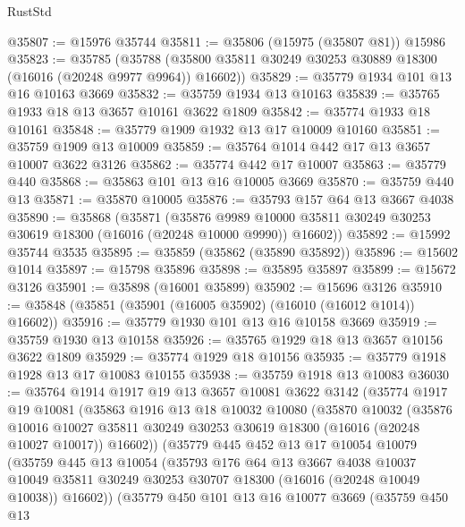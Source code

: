 \begin{lexlean}{RustStd}
\begin{coremodule}
@35807 := @15976 @35744
@35811 := @35806 (@15975 (@35807 @81)) @15986
@35823 := @35785
    (@35788 (@35800 @35811 @30249 @30253 @30889 @18300 (@16016 (@20248 @9977 @9964)) @16602))
@35829 := @35779 @1934 @101 @13 @16 @10163 @3669
@35832 := @35759 @1934 @13 @10163
@35839 := @35765 @1933 @18 @13 @3657 @10161 @3622 @1809
@35842 := @35774 @1933 @18 @10161
@35848 := @35779 @1909 @1932 @13 @17 @10009 @10160
@35851 := @35759 @1909 @13 @10009
@35859 := @35764 @1014 @442 @17 @13 @3657 @10007 @3622 @3126
@35862 := @35774 @442 @17 @10007
@35863 := @35779 @440
@35868 := @35863 @101 @13 @16 @10005 @3669
@35870 := @35759 @440 @13
@35871 := @35870 @10005
@35876 := @35793 @157 @64 @13 @3667 @4038
@35890 := @35868
    (@35871
      (@35876
        @9989
        @10000
        @35811
        @30249
        @30253
        @30619
        @18300
        (@16016 (@20248 @10000 @9990))
        @16602))
@35892 := @15992 @35744 @3535
@35895 := @35859 (@35862 (@35890 @35892))
@35896 := @15602 @1014
@35897 := @15798 @35896
@35898 := @35895 @35897
@35899 := @15672 @3126
@35901 := @35898 (@16001 @35899)
@35902 := @15696 @3126
@35910 := @35848 (@35851 (@35901 (@16005 @35902) (@16010 (@16012 @1014)) @16602))
@35916 := @35779 @1930 @101 @13 @16 @10158 @3669
@35919 := @35759 @1930 @13 @10158
@35926 := @35765 @1929 @18 @13 @3657 @10156 @3622 @1809
@35929 := @35774 @1929 @18 @10156
@35935 := @35779 @1918 @1928 @13 @17 @10083 @10155
@35938 := @35759 @1918 @13 @10083
@36030 := @35764
    @1914
    @1917
    @19
    @13
    @3657
    @10081
    @3622
    @3142
    (@35774
      @1917
      @19
      @10081
      (@35863
        @1916
        @13
        @18
        @10032
        @10080
        (@35870
          @10032
          (@35876
            @10016
            @10027
            @35811
            @30249
            @30253
            @30619
            @18300
            (@16016 (@20248 @10027 @10017))
            @16602))
        (@35779
          @445
          @452
          @13
          @17
          @10054
          @10079
          (@35759
            @445
            @13
            @10054
            (@35793
              @176
              @64
              @13
              @3667
              @4038
              @10037
              @10049
              @35811
              @30249
              @30253
              @30707
              @18300
              (@16016 (@20248 @10049 @10038))
              @16602))
          (@35779
            @450
            @101
            @13
            @16
            @10077
            @3669
            (@35759
              @450
              @13

\end{coremodule}
\end{lexlean}

